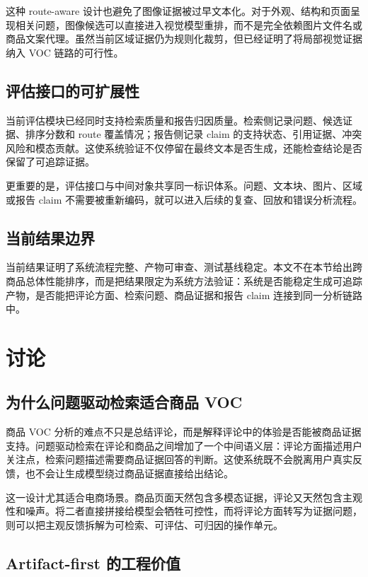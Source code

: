 \documentclass[11pt]{article}
\begin{document}
这种 route-aware 设计也避免了图像证据被过早文本化。对于外观、结构和页面呈现相关问题，图像候选可以直接进入视觉模型重排，而不是完全依赖图片文件名或商品文案代理。虽然当前区域证据仍为规则化裁剪，但已经证明了将局部视觉证据纳入 VOC 链路的可行性。

\subsection{评估接口的可扩展性}

当前评估模块已经同时支持检索质量和报告归因质量。检索侧记录问题、候选证据、排序分数和 route 覆盖情况；报告侧记录 claim 的支持状态、引用证据、冲突风险和模态贡献。这使系统验证不仅停留在最终文本是否生成，还能检查结论是否保留了可追踪证据。

更重要的是，评估接口与中间对象共享同一标识体系。问题、文本块、图片、区域或报告 claim 不需要被重新编码，就可以进入后续的复查、回放和错误分析流程。

\subsection{当前结果边界}

当前结果证明了系统流程完整、产物可审查、测试基线稳定。本文不在本节给出跨商品总体性能排序，而是把结果限定为系统方法验证：系统是否能稳定生成可追踪产物，是否能把评论方面、检索问题、商品证据和报告 claim 连接到同一分析链路中。

\section{讨论}
\subsection{为什么问题驱动检索适合商品 VOC}

商品 VOC 分析的难点不只是总结评论，而是解释评论中的体验是否能被商品证据支持。问题驱动检索在评论和商品之间增加了一个中间语义层：评论方面描述用户关注点，检索问题描述需要商品证据回答的判断。这使系统既不会脱离用户真实反馈，也不会让生成模型绕过商品证据直接给出结论。

这一设计尤其适合电商场景。商品页面天然包含多模态证据，评论又天然包含主观性和噪声。将二者直接拼接给模型会牺牲可控性，而将评论方面转写为证据问题，则可以把主观反馈拆解为可检索、可评估、可归因的操作单元。

\subsection{Artifact-first 的工程价值}
\end{document}
